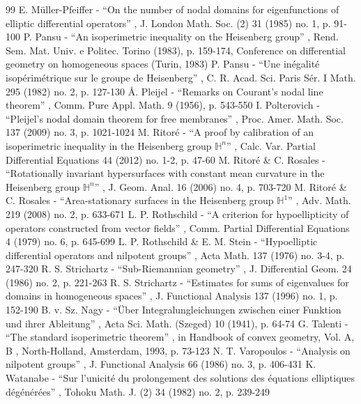 \documentclass[11pt]{article}
\theoremstyle{definition}
\newcommand{\1}{\mathbbm{1}}
\numberwithin{equation}{section}
\begin{document}
\begin{thebibliography}{99}
 E. Müller-Pfeiffer - “On the number of nodal domains for eigenfunctions of elliptic differential operators” , J. London Math. Soc. (2) 31 (1985) no. 1, p. 91-100
 P. Pansu - “An isoperimetric inequality on the Heisenberg group” , Rend. Sem. Mat. Univ. e Politec. Torino (1983), p. 159-174, Conference on differential geometry on homogeneous spaces (Turin, 1983)
 P. Pansu - “Une inégalité isopérimétrique sur le groupe de Heisenberg” , C. R. Acad. Sci. Paris Sér. I Math. 295 (1982) no. 2, p. 127-130
 Å. Pleijel - “Remarks on Courant’s nodal line theorem” , Comm. Pure Appl. Math. 9 (1956), p. 543-550
 I. Polterovich - “Pleijel’s nodal domain theorem for free membranes” , Proc. Amer. Math. Soc. 137 (2009) no. 3, p. 1021-1024
 M. Ritoré - “A proof by calibration of an isoperimetric inequality in the Heisenberg group ${\mathbb{H}}^n$” , Calc. Var. Partial Differential Equations 44 (2012) no. 1-2, p. 47-60
 M. Ritoré \& C. Rosales - “Rotationally invariant hypersurfaces with constant mean curvature in the Heisenberg group $\mathbb{H}^n$” , J. Geom. Anal. 16 (2006) no. 4, p. 703-720
 M. Ritoré \& C. Rosales - “Area-stationary surfaces in the Heisenberg group $\mathbb{H}^1$” , Adv. Math. 219 (2008) no. 2, p. 633-671
 L. P. Rothschild - “A criterion for hypoellipticity of operators constructed from vector fields” , Comm. Partial Differential Equations 4 (1979) no. 6, p. 645-699
 L. P. Rothschild \& E. M. Stein - “Hypoelliptic differential operators and nilpotent groups” , Acta Math. 137 (1976) no. 3-4, p. 247-320
 R. S. Strichartz - “Sub-Riemannian geometry” , J. Differential Geom. 24 (1986) no. 2, p. 221-263
 R. S. Strichartz - “Estimates for sums of eigenvalues for domains in homogeneous spaces” , J. Functional Analysis 137 (1996) no. 1, p. 152-190
 B. v. Sz. Nagy - “Über Integralungleichungen zwischen einer Funktion und ihrer Ableitung” , Acta Sci. Math. (Szeged) 10 (1941), p. 64-74
 G. Talenti - “The standard isoperimetric theorem” , in Handbook of convex geometry, Vol. A, B , North-Holland, Amsterdam, 1993, p. 73-123
 N. T. Varopoulos - “Analysis on nilpotent groups” , J. Functional Analysis 66 (1986) no. 3, p. 406-431
 K. Watanabe - “Sur l’unicité du prolongement des solutions des équations elliptiques dégénérées” , Tohoku Math. J. (2) 34 (1982) no. 2, p. 239-249
\end{thebibliography}
\end{document}
